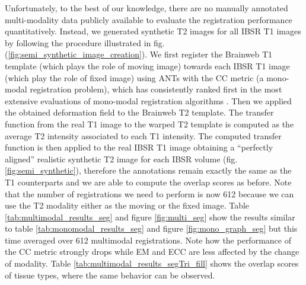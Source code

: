 
Unfortunately, to the best of our knowledge, there are no manually annotated multi-modality data publicly available to evaluate the registration performance quantitatively. Instead, we generated synthetic T2 images for all IBSR T1 images by following the procedure illustrated in fig. (\ref{fig:semi_synthetic_image_creation}). We first register the Brainweb T1 template (which plays the role of moving image) towards each IBSR T1 image (which play the role of fixed image) using ANTs with the CC metric (a mono-modal registration problem), which has consistently ranked first in the most extensive evaluations of mono-modal registration algorithms \cite{Klein2009} \cite{Klein2010} \cite{Rohlfing2012}. Then we applied the obtained deformation field to the Brainweb T2 template. The transfer function from the real T1 image to the warped T2 template is computed as the average T2 intensity associated to each T1 intensity. The computed transfer function is then applied to the real IBSR T1 image obtaining a ``perfectly aligned'' realistic synthetic T2 image for each IBSR volume (fig. \ref{fig:semi_synthetic}), therefore the annotations remain exactly the same as the T1 counterparts and we are able to compute the overlap scores as before. Note that the number of registrations we need to perform is now 612 because we can use the T2 modality either as the moving or the fixed image. Table \ref{tab:multimodal_results_seg} and figure \ref{fig:multi_seg} show the results similar to table \ref{tab:monomodal_results_seg} and figure \ref{fig:mono_graph_seg} but this time averaged over 612 multimodal registrations. Note how the performance of the CC metric strongly drops while EM and ECC are less affected by the change of modality. Table \ref{tab:multimodal_results_segTri_fill} shows the overlap scores of tissue types, where the same behavior can be observed.\\


